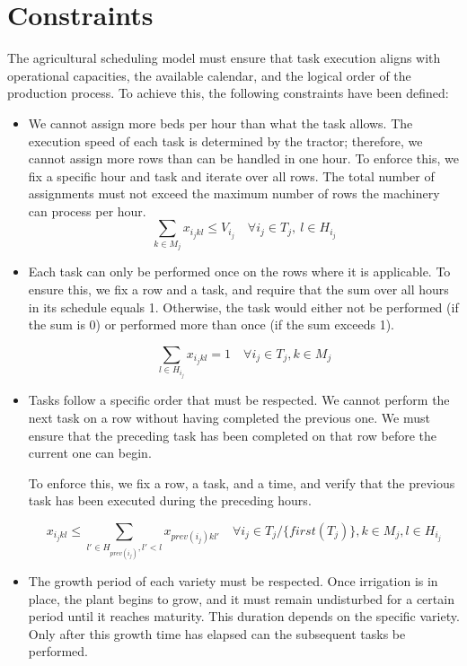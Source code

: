 \section*{Constraints}
The agricultural scheduling model must ensure that task execution aligns with operational capacities,  
the available calendar, and the logical order of the production process.  
To achieve this, the following constraints have been defined:
\begin{itemize}
    \item We cannot assign more beds per hour than what the task allows.  
    The execution speed of each task is determined by the tractor; therefore, we cannot assign more rows than can be handled in one hour.  
    To enforce this, we fix a specific hour and task and iterate over all rows.  
    The total number of assignments must not exceed the maximum number of rows the machinery can process per hour.
    \[
            \sum_{k\in M_j}x_{i_j kl} \leq V_{i_j} \quad \forall i_j \in T_j, \ l\in H_{i_j}
        \]
    \item Each task can only be performed once on the rows where it is applicable.  
        To ensure this, we fix a row and a task, and require that the sum over all hours in its schedule equals 1.  
        Otherwise, the task would either not be performed (if the sum is 0) or performed more than once (if the sum exceeds 1).
        
        \[
	        \sum_{l\in H_{i_j}}x_{i_j kl} =1 \quad \forall i_j \in T_j , k \in M_j
        \]
    \item Tasks follow a specific order that must be respected.  
        We cannot perform the next task on a row without having completed the previous one.  
        We must ensure that the preceding task has been completed on that row before the current one can begin.
        
        To enforce this, we fix a row, a task, and a time, and verify that the previous task has been executed during the preceding hours.
         
        \[
	        x_{i_j kl} \leq \sum_{l' \in H_{prev(i_j)}, l'<l}x_{prev(i_j)kl'} \quad \forall i_j\in T_j/\{first(T_j)\}, k\in M_j, l \in H_{i_j}
        \]
	
    \item The growth period of each variety must be respected. 
        Once irrigation is in place, the plant begins to grow,  
        and it must remain undisturbed for a certain period until it reaches maturity. This duration depends on the specific variety.  
        Only after this growth time has elapsed can the subsequent tasks be performed.
        

\end{itemize}
